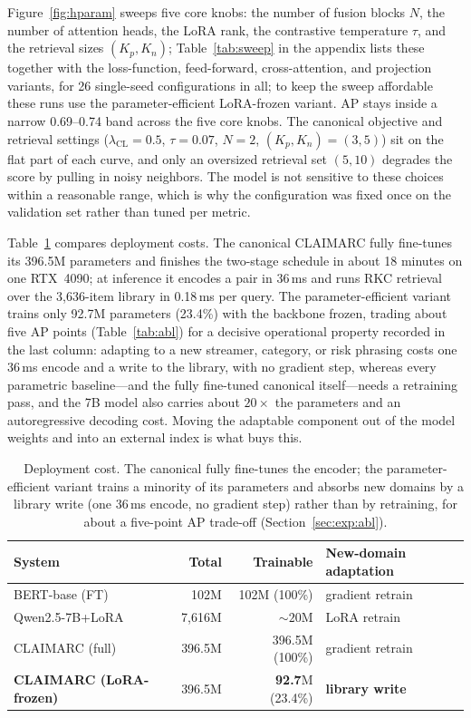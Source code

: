 \documentclass[11pt]{article}
\newcommand{\best}[1]{\textbf{#1}}
\begin{document}
Figure~\ref{fig:hparam} sweeps five core knobs: the number of fusion blocks
$N$, the number of attention heads, the LoRA rank, the contrastive temperature
$\tau$, and the retrieval sizes $(K_p,K_n)$; Table~\ref{tab:sweep} in the
appendix lists these together with the loss-function, feed-forward,
cross-attention, and projection variants, for 26 single-seed configurations in
all; to keep the sweep affordable these runs use the parameter-efficient
LoRA-frozen variant. AP stays inside a narrow 0.69--0.74 band across the five
core knobs. The canonical objective and retrieval settings
($\lambda_{\mathrm{CL}}{=}0.5$, $\tau{=}0.07$, $N{=}2$, $(K_p,K_n){=}(3,5)$) sit
on the flat part of each curve, and only an oversized retrieval set $(5,10)$
degrades the score by pulling in noisy neighbors. The model is not sensitive to
these choices within a reasonable range, which is why the configuration was
fixed once on the validation set rather than tuned per metric.

Table~\ref{tab:eff} compares deployment costs. The canonical CLAIMARC fully
fine-tunes its 396.5M parameters and finishes the two-stage schedule in about
18 minutes on one RTX~4090; at inference it encodes a pair in 36\,ms and runs
RKC retrieval over the 3{,}636-item library in 0.18\,ms per
query. The parameter-efficient variant trains only 92.7M parameters (23.4\%)
with the backbone frozen, trading about five AP points (Table~\ref{tab:abl}) for
a decisive operational property recorded in the last column: adapting to a new
streamer, category, or risk phrasing costs one 36\,ms encode and a write to the
library, with no gradient step, whereas every parametric baseline---and the
fully fine-tuned canonical itself---needs a retraining pass, and the 7B model
also carries about $20\times$ the parameters and an autoregressive decoding cost.
Moving the adaptable component out of the model weights and into an external
index is what buys this.

\begin{table}[t]
\centering\small
\setlength{\tabcolsep}{6pt}
\begin{tabular}{lrrl}
\toprule
\textbf{System} & \textbf{Total} & \textbf{Trainable} & \textbf{New-domain adaptation} \\
\midrule
BERT-base (FT)         & 102M     & 102M (100\%)          & gradient retrain \\
Qwen2.5-7B+LoRA        & 7{,}616M & ${\sim}20$M           & LoRA retrain \\
CLAIMARC (full)        & 396.5M   & 396.5M (100\%)        & gradient retrain \\
\textbf{CLAIMARC (LoRA-frozen)} & 396.5M & \best{92.7}M (23.4\%) & \textbf{library write} \\
\bottomrule
\end{tabular}
\caption{Deployment cost. The canonical fully fine-tunes the encoder; the
parameter-efficient variant trains a minority of its parameters and absorbs new
domains by a library write (one 36\,ms encode, no gradient step) rather than by
retraining, for about a five-point AP trade-off (Section~\ref{sec:exp:abl}).}
\label{tab:eff}
\end{table}
\end{document}
